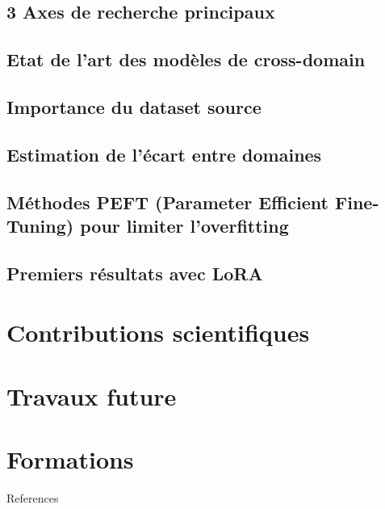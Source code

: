 \documentclass[xcolor=table, 8pt]{beamer}
\begin{document}
    \subsection{3 Axes de recherche principaux}\label{subsec:fs-od-cd-research}
    
    \subsection{Etat de l'art des modèles de cross-domain}\label{subsec:fs-od-cd-sota}
    

    \subsection{Importance du dataset source}\label{subsec:srcdata}
    


    \subsection{Estimation de l'écart entre domaines}\label{subsec:results-variances}
    
    
    
    

    \subsection{Méthodes PEFT (Parameter Efficient Fine-Tuning) pour limiter l'overfitting}\label{sec:peft}
    
    

    \subsection{Premiers résultats avec LoRA}\label{subsec:results-loracurves}
    




    \section{Contributions scientifiques}\label{subsec:approach-publications}
    

    \section{Travaux future}\label{subsec:approach-future-work}
    

    \section{Formations}\label{subsec:formations}
    


    \begin{frame}[allowframebreaks=]{References}
        \printbibliography
    \end{frame}
\end{document}
